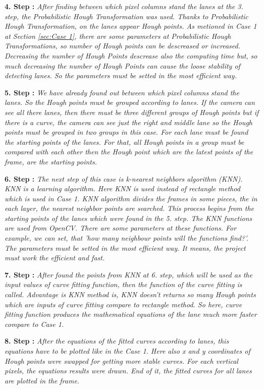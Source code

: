 \textbf{4. Step : }\emph{\color{blue}After finding between which pixel columns stand the lanes at the 3. step, the Probabilistic Hough Transformation was used. Thanks to Probabilistic Hough Transformation, on the lanes appear Hough points. As metioned in Case 1 at Section \ref{sec:Case 1}, there are some parameters at Probabilistic Hough Transformations, so number of Hough points can be descreased or increased. Decreasing the number of Hough Points descrease also the computing time but, so much decreasing the number of Hough Points can cause the loose stability of detecting lanes. So the parameters must be setted in the most efficient way.}

\textbf{5. Step : }\emph{\color{blue}We have already found out between which pixel columns stand the lanes. So the Hough points must be grouped according to lanes. If the camera can see all there lanes, then there must be three different groups of Hough points but if there is a curve, the camera can see just the right and middle lane so the Hough points must be grouped in two groups in this case. For each lane must be found the starting points of the lanes. For that, all Hough points in a group must be compared with each other then the Hough point which are the latest points of the frame, are the starting points.}

\textbf{6. Step : }\emph{\color{blue}The next step of this case is k-nearest neighbors algorithm (KNN). KNN is a learning algorithm. Here KNN is used instead of rectangle method which is used in Case 1. KNN algorithm divides the frames in some pieces, the in each layer, the nearest neighbor points are searched. This process begins from the starting points of the lanes which were found in the 5. step. The KNN functions are used from OpenCV. There are some parameters at these functions. For example, we can set, that 'how many neighbour points will the functions find?'. The parameters must be setted in the most efficient way. It means, the project must work the efficient and fast.}

\textbf{7. Step : }\emph{\color{blue}After found the points from KNN at 6. step, which will be used as the input values of curve fitting function, then the function of the curve fitting is called. Advantage is KNN method is, KNN doesn't returns so many Hough points which are inputs of curve fitting compare to rectangle method. So here, curve fitting function produces the mathematical equations of the lane much more faster compare to Case 1.} 

\textbf{8. Step : }\emph{\color{blue}After the equations of the fitted curves according to lanes, this equations have to be plotted like in the Case 1. Here also x and y coordinates of Hough points were swapped for getting more stable curves. For each vertical pixels, the equations results were drawn. End of it, the fitted curves for all lanes are plotted in the frame.}


